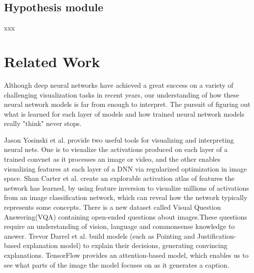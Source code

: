 \documentclass[10pt,twocolumn,letterpaper]{article}
\begin{document}
\subsection{Hypothesis module}
xxx

\section{Related Work}
Although deep neural networks have achieved a great success on a variety of challenging visualization tasks in recent years, our understanding of how these neural network models is far from enough to interpret.
The pursuit of figuring out what is learned for each layer of models and how trained neural network models really "think" never stops.

Jason Yosinski et al. provide two useful tools for visualizing and interpreting neural nets. One is to visualize  the activations produced on each layer of a trained convnet as it processes an image or video, and the other enables visualizing features at each layer of a DNN via regularized optimization in image space.
Shan Carter et al. create an explorable activation atlas of features the network has learned, by using feature inversion to visualize millions of activations from an image classification network, which can reveal how the network typically represents some concepts.
There is a new dataset called Visual Question Answering(VQA) containing open-ended questions about images.These questions require an understanding of vision, language and commonsense knowledge to answer.
Trevor Darrel et al. build  models (such as Pointing and Justification-based explanation model) to explain their decisions, generating convincing explanations.
TensorFlow provides an attention-based model, which enables us to see what parts of the image the model focuses on as it generates a caption.
\end{document}
